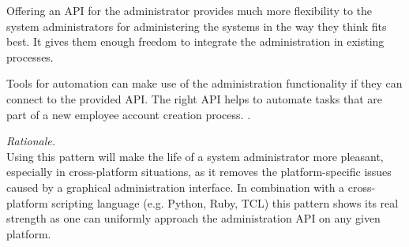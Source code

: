 Offering an API for the administrator provides much more flexibility to the system administrators for administering the systems in the way they think fits best. It gives them enough freedom to integrate the administration in existing processes.

Tools for automation can make use of the administration functionality if they can connect to the provided API. The right API helps to automate tasks that are part of a new employee account creation process. \cite{Limoncelli2011a}.

\begin{center}
   
\end{center}

\textit{Rationale.}\\
Using this pattern will make the life of a system administrator more pleasant, especially in cross-platform situations, as it removes the platform-specific issues caused by a graphical administration interface. In combination with a cross-platform scripting language (e.g. Python, Ruby, TCL) this pattern shows its real strength as one can uniformly approach the administration API on any given platform.

